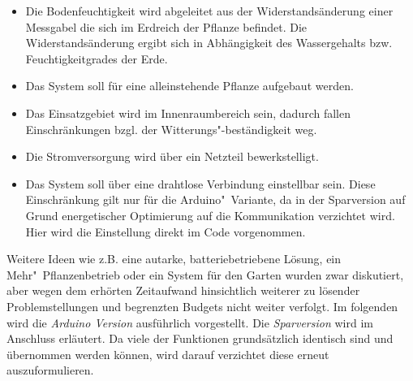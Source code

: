 \documentclass[]{IEEEtran}
\begin{document}
\begin{itemize}
	\item Die Bodenfeuchtigkeit wird abgeleitet aus der Widerstandsänderung einer Messgabel die sich im Erdreich der Pflanze befindet. Die Widerstandsänderung ergibt sich in Abhängigkeit des Wassergehalts bzw. Feuchtigkeitgrades der Erde.
	\item Das System soll für eine alleinstehende Pflanze aufgebaut werden. 
	\item Das Einsatzgebiet wird im Innenraumbereich sein, dadurch fallen Einschränkungen bzgl. der Witterungs"-beständigkeit weg.
	\item Die Stromversorgung wird über ein Netzteil bewerkstelligt. 
	\item Das System soll über eine drahtlose Verbindung einstellbar sein. Diese Einschränkung gilt nur für die Arduino"~Variante, da in der Sparversion auf Grund energetischer Optimierung auf die Kommunikation verzichtet wird. Hier wird die Einstellung direkt im Code vorgenommen.

\end{itemize}

Weitere Ideen wie z.B. eine autarke, batteriebetriebene Lösung, ein Mehr"~Pflanzenbetrieb oder ein System für den Garten wurden zwar diskutiert, aber wegen dem erhörten Zeitaufwand hinsichtlich weiterer zu lösender Problemstellungen und begrenzten Budgets nicht weiter verfolgt. 
Im folgenden wird die \emph{Arduino Version} ausführlich vorgestellt. 
Die \emph{Sparversion} wird im Anschluss erläutert. Da viele der Funktionen grundsätzlich identisch sind und übernommen werden können, wird darauf verzichtet diese erneut auszuformulieren. 







\end{document}
